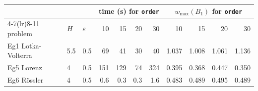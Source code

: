 \begin{tabular}{lll rrrr rrrr}
\toprule
& & & \multicolumn{4}{c}{time (s) for \texttt{order}} & \multicolumn{4}{c}{$w_{\max}(B_1)$ for \texttt{order}} \\
\cmidrule(lr){4-7}\cmidrule(lr){8-11}
problem & $H$ & $\varepsilon$ & 10 & 15 & 20 & 30 & 10 & 15 & 20 & 30 \\
\midrule
Eg1 Lotka-Volterra & 5.5 & 0.5 & 69 & 41 & 30 & 40 & 1.037 & 1.008 & 1.061 & 1.136 \\
Eg5 Lorenz & 4 & 0.5 & 151 & 129 & 74 & 324 & 0.395 & 0.368 & 0.447 & 0.350 \\
Eg6 R\"ossler & 4 & 0.5 & 0.6 & 0.3 & 0.3 & 1.6 & 0.483 & 0.489 & 0.495 & 0.489 \\
\bottomrule
\end{tabular}

